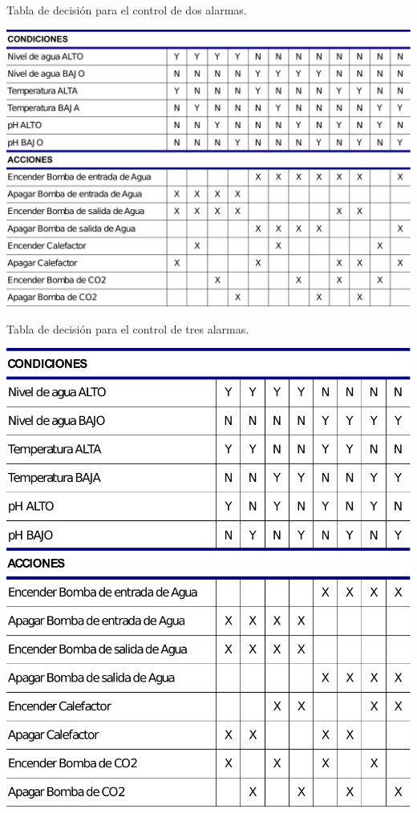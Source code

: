 \begin{table}[h]
\centering
\caption{Tabla de decisión para el control de dos alarmas.}
\includegraphics[height=.4\textheight]{./Figures/tabla2alarmas.pdf}
\label{tab:2alarmas}
\end{table}

\vspace{5px}

\begin{table}[h!]
	\centering
	\caption{Tabla de decisión para el control de tres alarmas.}
    \includegraphics[height=.5\textheight]{./Figures/tabla3alarmas.pdf}
	\label{tab:3alarmas}
\end{table}

